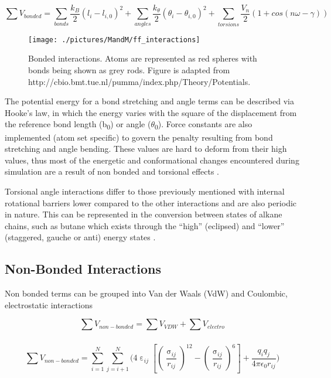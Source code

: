 \begin{equation}
\sum_{} V_{bonded} = \sum_{bonds}\frac{k_B}{2}(l_i - l_{i,0})^2  + \sum_{angles}\frac{k_\theta}{2}(\theta_i - \theta_{i,0})^2  + \sum_{torsions}\frac{V_n}{2}(1+cos(n\omega - \gamma))  \label{eq:bonded_inter2}
\end{equation}

\begin{figure}[H]
\begin{center}
\texttt{[image: ./pictures/MandM/ff\_interactions]}
\caption[Bonded interactions] {Bonded interactions. Atoms are represented as red spheres with bonds being shown as grey rods. Figure is adapted from http://cbio.bmt.tue.nl/pumma/index.php/Theory/Potentials.}
\label{fig:ff_interactions}
\end{center}
\end{figure}

The potential energy for a bond stretching and angle terms can be described via Hooke's law, in which the energy varies with the square of the displacement from the reference bond length (b\textsubscript{0}) or angle ($\theta$\textsubscript{0}). Force constants are also implemented (atom set specific) to govern the penalty resulting from bond stretching and angle bending. These values are hard to deform from their high values, thus most of the energetic and conformational changes encountered during simulation are a result of non bonded and torsional effects \cite{Leach2001}.

Torsional angle interactions differ to those previously mentioned with internal rotational barriers lower compared to the other interactions and are also periodic in nature. This can be represented in the conversion between states of alkane chains, such as butane which exists through the ``high'' (eclipsed) and ``lower'' (staggered, gauche or anti) energy states \cite{Mo2010}.

\subsection{Non-Bonded Interactions}

Non bonded terms can be grouped into Van der Waals (VdW) and Coulombic, electrostatic interactions 

\begin{equation}
\sum_{} V_{non-bonded} = \sum_{} V_{VDW} + \sum_{} V_{electro} 
\label{eq:nonbonded_inter}
\end{equation}


\begin{equation}
\sum_{} V_{non-bonded} = \sum\limits_{i=1}^N \sum\limits_{j=i+1}^N  \Bigg( 4 \upepsilon_{ij} \left[ \left( \frac{\upsigma_{ij}}{r_{ij}} \right)^{12} - \left( \frac{\upsigma_{ij}}{r_{ij}} \right)^6 \right] + \frac{q_i q_j}{4\pi \epsilon_0 r_{ij}}\Bigg)
\end{equation}


